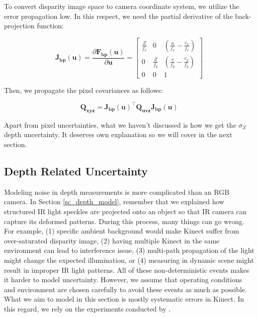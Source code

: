 \documentclass[12pt]{report}
\numberwithin{figure}{section}
\begin{document}
To convert disparity image space to camera coordinate system, we utilize the
error propagation low. In this respect, we need the partial derivative of the
back-projection function:

\begin{equation} \label{eq:jacob_back_proj}
  \mathbf{J_{bp}}(\mathbf{u}) = \frac{\partial
\mathbf{F_{bp}}(\mathbf{u})}{\partial \mathbf{u}}  = \begin{bmatrix}
\frac{Z}{f_x} & 0 & (\frac{u}{f_x} - \frac{c_x}{f_x}) \\ 0 & \frac{Z}{f_y} &
(\frac{v}{f_y} - \frac{c_y}{f_y}) \\ 0 & 0 & 1 \end{bmatrix} \end{equation}

Then, we propagate the pixel covariances as follows:

\begin{equation} \mathbf{Q_{xyz}} = \mathbf{J_{bp}}(\mathbf{u})^\top
\mathbf{Q_{uvz}} \mathbf{J_{bp}}(\mathbf{u}) \end{equation}


Apart from pixel uncertainties, what we haven't discussed is how we get the
$\sigma_Z$ depth uncertainty.  It deserves own explanation so we will cover in
the next section.

\subsection{Depth Related Uncertainty} \label{sb_sc_depth_uncertainty}

Modeling noise in depth measurements is more complicated than an RGB camera.
In Section \ref{sc_depth_model}, remember that we explained how structured IR
light speckles are projected onto an object so that IR camera can capture its
deformed patterns.  During this process, many things can go wrong. For example,
(1) specific ambient background would make Kinect suffer from over-saturated
disparity image, (2) having multiple Kinect in the same environment can lead to
interference issue, (3) multi-path propagation of the light might change the
expected illumination, or (4) measuring in dynamic scene might result in
improper IR light patterns. All of these non-deterministic events makes it
harder to model uncertainty. However, we assume that operating conditions
and environment are chosen carefully to avoid these events as much as possible.
What we aim to model in this section is mostly systematic errors in Kinect. In
this regard, we rely on the experiments conducted by \parencite{Nguyen2012a}. 
\end{document}
